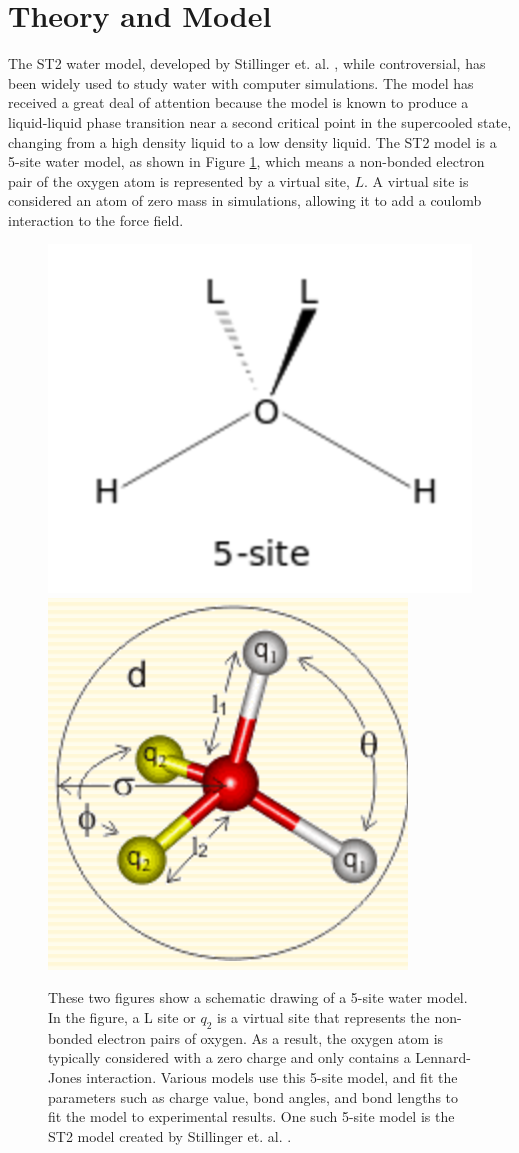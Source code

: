 \section{Theory and Model}
The ST2 water model, developed by Stillinger et. al. \cite{Stillinger1974}, while controversial, has been widely used to study water with computer simulations.  The model has received a great deal of attention because the model is known to produce a liquid-liquid phase transition near a second critical point in the supercooled state, changing from a high density liquid to a low density liquid.  The ST2 model is a 5-site water model, as shown in Figure \ref{ST2_model}, which means a non-bonded electron pair of the oxygen atom is represented by a virtual site, $L$.  A virtual site is considered an atom of zero mass in simulations, allowing it to add a coulomb interaction to the force field.  
\begin{figure}
	\centering
	\includegraphics[width=.2\textwidth]{./Figures/Appendix/ST2_diagram.png}
	\hspace{.1\textwidth}
	\includegraphics[width=.2\textwidth]{./Figures/Appendix/ST2_model.png}
	\caption[These two figures show a schematic drawing of a 5-site water model.  In the figure, a L site or $q_2$ is a virtual site that represents the non-bonded electron pairs of oxygen.  As a result, the oxygen atom is typically considered with a zero charge and only contains a Lennard-Jones interaction.  Various models use this 5-site model, and fit the parameters such as charge value, bond angles, and bond lengths to fit the model to experimental results.  One such 5-site model is the ST2 model created by Stillinger et. al.]{These two figures show a schematic drawing of a 5-site water model.  In the figure, a L site or $q_2$ is a virtual site that represents the non-bonded electron pairs of oxygen.  As a result, the oxygen atom is typically considered with a zero charge and only contains a Lennard-Jones interaction.  Various models use this 5-site model, and fit the parameters such as charge value, bond angles, and bond lengths to fit the model to experimental results.  One such 5-site model is the ST2 model created by Stillinger et. al. \cite{Stillinger1974}.}
	\label{ST2_model}
\end{figure}

